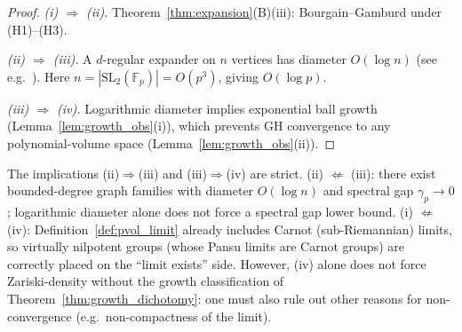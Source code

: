 \begin{proof}
  \emph{(i) $\Rightarrow$ (ii).}
  Theorem~\ref{thm:expansion}(B)(iii): Bourgain--Gamburd under (H1)--(H3).

  \emph{(ii) $\Rightarrow$ (iii).}
  A $d$-regular expander on $n$ vertices has diameter $O(\log n)$
  (see e.g.~\cite{lubotzky1994discrete}).
  Here $n = |\mathrm{SL}_2(\mathbb{F}_p)| = O(p^3)$, giving $O(\log p)$.

  \emph{(iii) $\Rightarrow$ (iv).}
  Logarithmic diameter implies exponential ball growth (Lemma~\ref{lem:growth_obs}(i)),
  which prevents GH convergence to any polynomial-volume space
  (Lemma~\ref{lem:growth_obs}(ii)).
\end{proof}

\begin{remark}
  \label{rem:ncto_conv}
  The implications (ii)$\Rightarrow$(iii) and (iii)$\Rightarrow$(iv) are strict.
  (ii) $\not\Leftarrow$ (iii): there exist bounded-degree graph families with
  diameter $O(\log n)$ and spectral gap $\gamma_p \to 0$; logarithmic diameter
  alone does not force a spectral gap lower bound.
  (i) $\not\Leftarrow$ (iv): Definition~\ref{def:pvol_limit} already includes
  Carnot (sub-Riemannian) limits, so virtually nilpotent groups (whose Pansu
  limits are Carnot groups) are correctly placed on the ``limit exists'' side.
  However, (iv) alone does not force Zariski-density without the growth
  classification of Theorem~\ref{thm:growth_dichotomy}: one must also rule out
  other reasons for non-convergence (e.g.\ non-compactness of the limit).
\end{remark}

